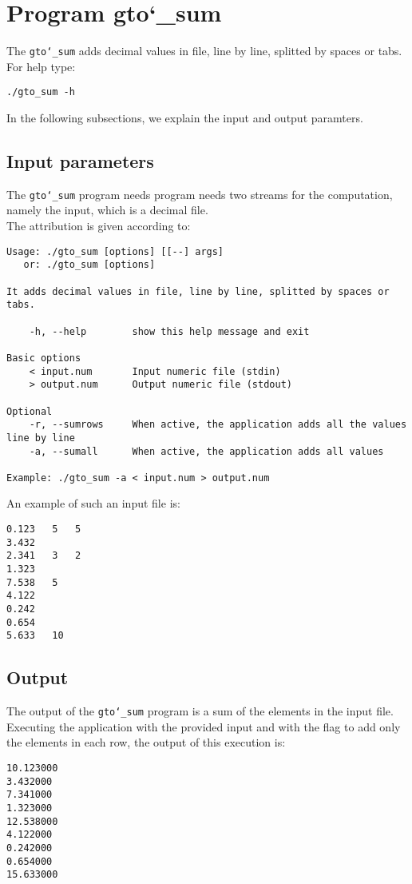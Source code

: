 \section{Program gto\char`_sum}
The \texttt{gto\char`_sum} adds decimal values in file, line by line, splitted by spaces or tabs.\\
For help type:
\begin{lstlisting}
./gto_sum -h
\end{lstlisting}
In the following subsections, we explain the input and output paramters.

\subsection*{Input parameters}

The \texttt{gto\char`_sum} program needs program needs two streams for the computation, namely the input, which is a decimal file.\\
The attribution is given according to:
\begin{lstlisting}
Usage: ./gto_sum [options] [[--] args]
   or: ./gto_sum [options]

It adds decimal values in file, line by line, splitted by spaces or tabs.

    -h, --help        show this help message and exit

Basic options
    < input.num       Input numeric file (stdin)
    > output.num      Output numeric file (stdout)

Optional
    -r, --sumrows     When active, the application adds all the values line by line
    -a, --sumall      When active, the application adds all values

Example: ./gto_sum -a < input.num > output.num
\end{lstlisting}
An example of such an input file is:
\begin{lstlisting}
0.123	5	5
3.432
2.341   3   2
1.323
7.538	5
4.122
0.242 
0.654
5.633	10
\end{lstlisting}

\subsection*{Output}
The output of the \texttt{gto\char`_sum} program is a sum of the elements in the input file.\\
Executing the application with the provided input and with the flag to add only the elements in each row, the output of this execution is:
\begin{lstlisting}
10.123000
3.432000
7.341000
1.323000
12.538000
4.122000
0.242000
0.654000
15.633000
\end{lstlisting}